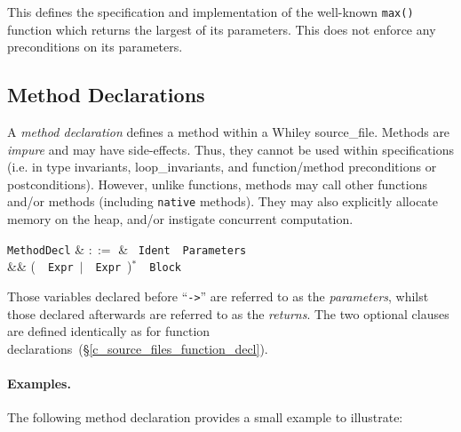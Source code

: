 

This defines the specification and implementation of the well-known \lstinline{max()} function which returns the largest of its parameters. This does not enforce any preconditions on its parameters.


\subsection{Method Declarations}
\label{c_source_files_method_decl}

A {\em method declaration} defines a method within a Whiley \gls{source_file}.  Methods are {\em impure} and may have side-effects.  Thus, they cannot be used within specifications (i.e. in type invariants, \gls{loop_invariant}s, and function/method \gls{precondition}s or \gls{postcondition}s).  However, unlike functions, methods may call other functions and/or methods (including \lstinline{native} methods).  They may also explicitly allocate memory on the heap, and/or instigate concurrent computation.

\begin{syntax}
  \verb+MethodDecl+ & $::=$ & \ \verb+Ident+\ \token{(}\ \verb+Parameters+\ \token{)}\ \\
  && \big(\ \ \verb+Expr+\ $|$\ \ \verb+Expr+\ \big)$^*$\ \token{:}\ \verb+Block+\\
\end{syntax}

Those variables declared before ``\lstinline{->}'' are referred to as the {\em parameters}, whilst those declared afterwards are referred to as the {\em returns}.  The two optional clauses are defined identically as for function declarations~(\S\ref{c_source_files_function_decl}).

\paragraph{Examples.}  The following method declaration provides a
small example to illustrate:






